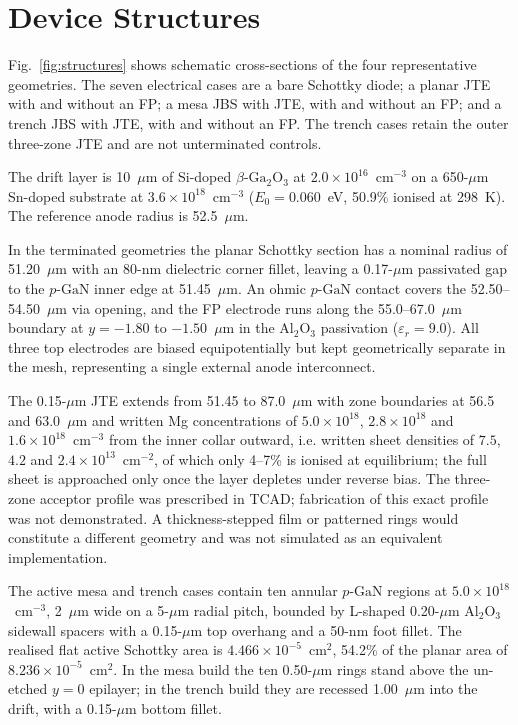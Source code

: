 \documentclass[journal,10pt]{IEEEtran}
\newcommand{\GaO}{\ensuremath{\beta\text{-}\mathrm{Ga}_2\mathrm{O}_3}}
\newcommand{\pGaN}{\ensuremath{p\text{-}\mathrm{GaN}}}
\begin{document}
\section{Device Structures}
Fig.~\ref{fig:structures} shows schematic cross-sections of the four representative geometries. The seven electrical cases are a bare Schottky diode; a planar JTE with and without an FP; a mesa JBS with JTE, with and without an FP; and a trench JBS with JTE, with and without an FP. The trench cases retain the outer three-zone JTE and are not unterminated controls.

The drift layer is 10~$\mu$m of Si-doped \GaO{} at $2.0\times10^{16}$~cm$^{-3}$ on a 650-$\mu$m Sn-doped substrate at $3.6\times10^{18}$~cm$^{-3}$ ($E_0=0.060$~eV, 50.9\% ionised at 298~K). The reference anode radius is 52.5~$\mu$m.

In the terminated geometries the planar Schottky section has a nominal radius of 51.20~$\mu$m with an 80-nm dielectric corner fillet, leaving a 0.17-$\mu$m passivated gap to the \pGaN{} inner edge at 51.45~$\mu$m. An ohmic \pGaN{} contact covers the 52.50--54.50~$\mu$m via opening, and the FP electrode runs along the 55.0--67.0~$\mu$m boundary at $y=-1.80$ to $-1.50$~$\mu$m in the Al$_2$O$_3$ passivation ($\varepsilon_r=9.0$). All three top electrodes are biased equipotentially but kept geometrically separate in the mesh, representing a single external anode interconnect.

The 0.15-$\mu$m JTE extends from 51.45 to 87.0~$\mu$m with zone boundaries at 56.5 and 63.0~$\mu$m and written Mg concentrations of $5.0\times10^{18}$, $2.8\times10^{18}$ and $1.6\times10^{18}$~cm$^{-3}$ from the inner collar outward, i.e. written sheet densities of $7.5$, $4.2$ and $2.4\times10^{13}$~cm$^{-2}$, of which only 4--7\% is ionised at equilibrium; the full sheet is approached only once the layer depletes under reverse bias. The three-zone acceptor profile was prescribed in TCAD; fabrication of this exact profile was not demonstrated. A thickness-stepped film or patterned rings would constitute a different geometry and was not simulated as an equivalent implementation.

The active mesa and trench cases contain ten annular \pGaN{} regions at $5.0\times10^{18}$~cm$^{-3}$, 2~$\mu$m wide on a 5-$\mu$m radial pitch, bounded by L-shaped 0.20-$\mu$m Al$_2$O$_3$ sidewall spacers with a 0.15-$\mu$m top overhang and a 50-nm foot fillet. The realised flat active Schottky area is $4.466\times10^{-5}$~cm$^2$, 54.2\% of the planar area of $8.236\times10^{-5}$~cm$^2$. In the mesa build the ten 0.50-$\mu$m rings stand above the un-etched $y=0$ epilayer; in the trench build they are recessed 1.00~$\mu$m into the drift, with a 0.15-$\mu$m bottom fillet.
\end{document}
